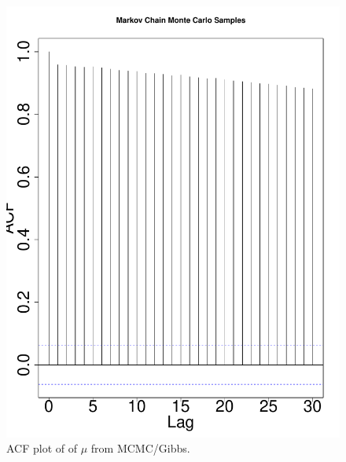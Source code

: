 \documentclass[11pt]{article}
\begin{document}
\begin{enumerate}
\begin{enumerate}
\begin{multicols}{2}
\begin{figure}[H]
\begin{center}
\includegraphics[scale=0.3]{figures/MCMCacf}
\caption{\label{fig:MCMCacf} ACF plot of of $\mu$ from MCMC/Gibbs.}
\end{center}
\end{figure}

\end{multicols}


\end{enumerate}


\end{enumerate}
\end{document}
